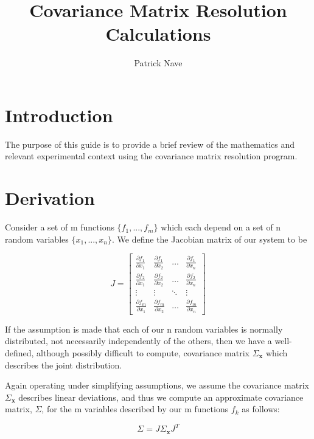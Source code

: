 \documentclass[aps,prl,twocolumn,groupedaddress]{revtex4-1}
\begin{document}
\title{Covariance Matrix Resolution Calculations}
\author{Patrick Nave}
\maketitle

\section{Introduction}

The purpose of this guide is to provide a brief review of the mathematics and relevant experimental context using the covariance matrix resolution program.

\section{Derivation}

Consider a set of m functions $\{f_1, ..., f_m\}$ which each depend on a set of n random variables $\{x_1, ..., x_n\}$.  We define the Jacobian matrix of our system to be

\begin{equation}
J = 
\begin{bmatrix}
    \frac{\partial f_1}{\partial x_1} & \frac{\partial f_1}{\partial x_2} & \dots  & \frac{\partial f_1}{\partial x_n} \\
    \frac{\partial f_2}{\partial x_1} & \frac{\partial f_2}{\partial x_2} & \dots  & \frac{\partial f_2}{\partial x_n} \\
    \vdots & \vdots & \ddots & \vdots \\
    \frac{\partial f_m}{\partial x_1} & \frac{\partial f_m}{\partial x_2} & \dots  & \frac{\partial f_m}{\partial x_n}
\end{bmatrix}
\end{equation}

If the assumption is made that each of our n random variables is normally distributed, not necessarily independently of the others, then we have a well-defined, although possibly difficult to compute, covariance matrix $\Sigma_{\mathbf{x}}$ which describes the joint distribution.

Again operating under simplifying assumptions, we assume the covariance matrix $\Sigma_{\mathbf{x}}$ describes linear deviations, and thus we compute an approximate covariance matrix, $\Sigma$, for the m variables described by our m functions $f_k$ as follows:

\begin{equation}
\Sigma = J \Sigma_{\mathbf{x}} J^T
\end{equation}
\end{document}
